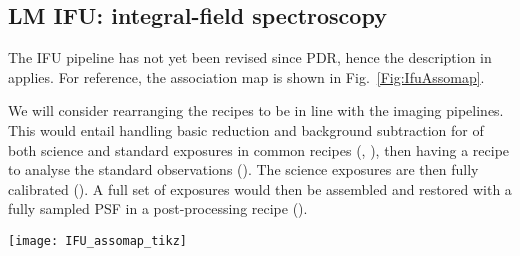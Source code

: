 \subsection{LM IFU: integral-field spectroscopy}
\label{ssec:overview_ifu}

The \ac{IFU} pipeline has not yet been revised since PDR, hence the
description in \cite{DRLS} applies. For reference, the association map
is shown in Fig.~\ref{Fig:IfuAssomap}.

We will consider rearranging the recipes to be in line with the
imaging pipelines. This would entail handling basic reduction and
background subtraction for of both science and standard exposures in
common recipes (, ),
then having a recipe to analyse the standard observations
(). The science exposures are then fully
calibrated (). A full set of exposures would
then be assembled and restored with a fully sampled PSF in a
post-processing recipe ().

\begin{sidewaysfigure}[ht]
  \centering
  \texttt{[image: IFU\_assomap\_tikz]}
  \caption[Reduction cascade and association map for IFU
  spectroscopy]{%
    Association map for \ac{IFU} spectroscopy in L- and M-band. The
    figure shows only the primary products created by each recipe; for
    a full list of products refer to the recipe descriptions in
    Sect.~\ref{ssec:IFU_recipes}. The dashed line separates
    calibration tasks that are done at AIT or infrequently during
    operations from tasks done daily. The prefix ``'' has been
    omitted from the recipe names to improve clarity.}
  \label{Fig:IfuAssomap}
\end{sidewaysfigure}




